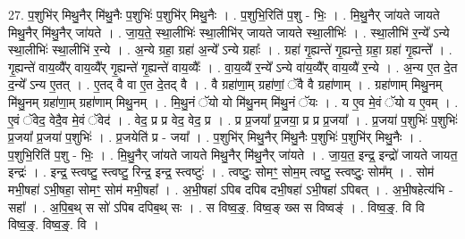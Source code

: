 \documentclass[17pt]{extarticle}
\begin{document}
27. प॒शुभि॑र् मिथु॒नैर् मि॑थु॒नैः प॒शुभिः॑ प॒शुभि॑र् मिथु॒नैः । . प॒शुभि॒रिति॑ प॒शु - भिः॒ । . मि॒थु॒नैर् जा॑यते जायते मिथु॒नैर् मि॑थु॒नैर् जा॑यते । . जा॒य॒ते॒ स्था॒लीभिः॑ स्था॒लीभि॑र् जायते जायते स्था॒लीभिः॑ । . स्था॒लीभि॑ र॒न्ये᳚ ऽन्ये स्था॒लीभिः॑ स्था॒लीभि॑ र॒न्ये । . अ॒न्ये ग्रहा॒ ग्रहा॑ अ॒न्ये᳚ ऽन्ये ग्रहाः᳚ । . ग्रहा॑ गृ॒ह्यन्ते॑ गृ॒ह्यन्ते॒ ग्रहा॒ ग्रहा॑ गृ॒ह्यन्ते᳚ । . गृ॒ह्यन्ते॑ वाय॒व्यै᳚र् वाय॒व्यै᳚र् गृ॒ह्यन्ते॑ गृ॒ह्यन्ते॑ वाय॒व्यैः᳚ । . वा॒य॒व्यै॑ र॒न्ये᳚ ऽन्ये वा॑य॒व्यै᳚र् वाय॒व्यै॑ र॒न्ये । . अ॒न्य ए॒त दे॒त द॒न्ये᳚ ऽन्य ए॒तत् । . ए॒तद् वै वा ए॒त दे॒तद् वै । . वै ग्रहा॑णा॒म् ग्रहा॑णां॒ ॅवै वै ग्रहा॑णाम् । . ग्रहा॑णाम् मिथु॒नम् मि॑थु॒नम् ग्रहा॑णा॒म् ग्रहा॑णाम् मिथु॒नम् । . मि॒थु॒नं ॅयो यो मि॑थु॒नम् मि॑थु॒नं ॅयः । . य ए॒व मे॒वं ॅयो य ए॒वम् । . ए॒वं ॅवेद॒ वेदै॒व मे॒वं ॅवेद॑ । . वेद॒ प्र प्र वेद॒ वेद॒ प्र । . प्र प्र॒जया᳚ प्र॒जया॒ प्र प्र प्र॒जया᳚ । . प्र॒जया॑ प॒शुभिः॑ प॒शुभिः॑ प्र॒जया᳚ प्र॒जया॑ प॒शुभिः॑ । . प्र॒जयेति॑ प्र - जया᳚ । . प॒शुभि॑र् मिथु॒नैर् मि॑थु॒नैः प॒शुभिः॑ प॒शुभि॑र् मिथु॒नैः । . प॒शुभि॒रिति॑ प॒शु - भिः॒ । . मि॒थु॒नैर् जा॑यते जायते मिथु॒नैर् मि॑थु॒नैर् जा॑यते । . जा॒य॒त॒ इन्द्र॒ इन्द्रो॑ जायते जायत॒ इन्द्रः॑ । . इन्द्र॒ स्त्वष्टु॒ स्त्वष्टु॒ रिन्द्र॒ इन्द्र॒ स्त्वष्टुः॑ । . त्वष्टुः॒ सोमꣳ॒॒ सोम॒म् त्वष्टु॒ स्त्वष्टुः॒ सोम᳚म् । . सोम॑ मभी॒षहा॑ ऽभी॒षहा॒ सोमꣳ॒॒ सोम॑ मभी॒षहा᳚ । . अ॒भी॒षहा॑ ऽपिब दपिब दभी॒षहा॑ ऽभी॒षहा॑ ऽपिबत् । . अ॒भी॒षहेत्य॑भि - सहा᳚ । . अ॒पि॒ब॒थ् स सो॑ ऽपिब दपिब॒थ् सः । . स विष्व॒ङ्॒. विष्व॒ङ् ख्स स विष्वङ्॑ । . विष्व॒ङ्॒. वि वि विष्व॒ङ्॒. विष्व॒ङ्॒. वि । \newline
\end{document}
